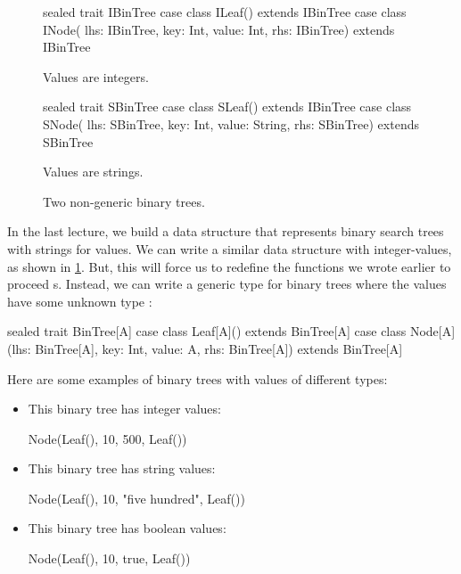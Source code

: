 \documentclass[9pt]{extbook}
\begin{document}
\begin{figure}

\begin{minipage}{0.45\textwidth}
\begin{scalacode}
sealed trait IBinTree
case class ILeaf() extends IBinTree
case class INode(
  lhs: IBinTree,
  key: Int,
  value: Int,
  rhs: IBinTree)
  extends IBinTree
\end{scalacode}
\caption{Values are integers.}
\end{minipage}
\quad\vrule\quad
\begin{minipage}{0.45\textwidth}
\begin{scalacode}
sealed trait SBinTree
case class SLeaf() extends IBinTree
case class SNode(
  lhs: SBinTree,
  key: Int,
  value: String,
  rhs: SBinTree)
  extends SBinTree
\end{scalacode}
\caption{Values are strings.}
\end{minipage}
\caption{Two non-generic binary trees.}
\label{monobintrees}
\end{figure}

In the last lecture, we build a data structure that represents binary
search trees with strings for values. We can write a similar data structure
with integer-values, as shown in \cref{monobintrees}. But, this will force
us to redefine the functions we wrote earlier to proceed s.
Instead, we can write a generic type for binary trees where the values have
some unknown type :

%
\begin{scalacode}
sealed trait BinTree[A]
case class Leaf[A]() extends BinTree[A]
case class Node[A](lhs: BinTree[A], key: Int, value: A, rhs: BinTree[A]) extends BinTree[A]
\end{scalacode}

Here are some examples of binary trees with values of different types:

\begin{itemize}

\item This binary tree has integer values:
\begin{scalacode}
Node(Leaf(), 10, 500, Leaf())
\end{scalacode}

\item This binary tree has string values:
\begin{scalacode}
Node(Leaf(), 10, "five hundred", Leaf())
\end{scalacode}

\item This binary tree has boolean values:
\begin{scalacode}
Node(Leaf(), 10, true, Leaf())
\end{scalacode}

\end{itemize}
\end{document}
